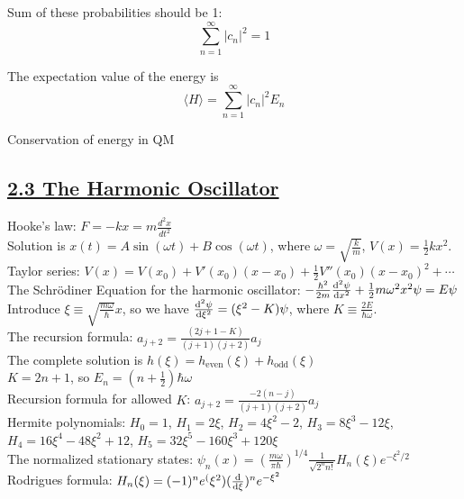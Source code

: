 Sum of these probabilities should be 1: 
    $$\sum_{n=1}^{\infty} |c_n|^2 = 1$$

The expectation value of the energy is
    $$\langle H \rangle = \sum_{n=1}^{\infty} |c_n|^2 E_n$$

Conservation of energy in QM

\subsection{\underline{2.3 The Harmonic Oscillator}}
Hooke's law: $F = -kx = m \frac{d^2 x}{d t^2}$ \\
Solution is $x(t) = A \sin(\omega t) + B \cos(\omega t)$, where $\omega = \sqrt{\frac{k}{m}}$, $V(x) = \frac{1}{2} k x^2$. \\

Taylor series: $V(x) = V(x_0) + V'(x_0) (x - x_0) + \frac{1}{2} V''(x_0)(x- x_0)^2 + \cdots$ \\

The Schr\"{o}diner Equation for the harmonic oscillator: $-\frac{\hbar^2}{2m} \dv[2]{\psi}{x} + \frac{1}{2} m \omega^2 x^2 \psi = E \psi$ \\
Introduce $\xi \equiv \sqrt{\frac{m \omega}{\hbar}} x$, so we have $\dv[2]{\psi}{\xi} = (\xi^2 - K) \psi$, where $K \equiv \frac{2E}{\hbar \omega}$. \\

The recursion formula: $a_{j+2} = \frac{(2j + 1 - K)}{(j + 1)(j + 2)} a_j$ \\
The complete solution is $h(\xi) = h_{\text{even}}(\xi) + h_{\text{odd}}(\xi)$ \\

$K = 2n + 1$, so $E_n = (n + \frac{1}{2}) \hbar \omega$ \\

Recursion formula for allowed $K$: $a_{j+2} = \frac{-2(n - j)}{(j+1)(j+2)} a_j$ \\

Hermite polynomials: $H_0 = 1$, $H_1 = 2 \xi$, $H_2 = 4 \xi^2 - 2$, $H_3 = 8 \xi^3 - 12 \xi$, $H_4 = 16 \xi^4 - 48 \xi^2 + 12$, $H_5 = 32 \xi^5 - 160 \xi^3 + 120 \xi$ \\

The normalized stationary states: $\psi_n(x) = (\frac{m \omega}{\pi \hbar})^{1/4} \frac{1}{\sqrt{2^n n!}} H_n(\xi) e^{-\xi^2 / 2}$ \\

Rodrigues formula: $H_n(\xi) = (-1)^n e^(\xi^2) (\dv{}{\xi})^n e^{-\xi^2}$

